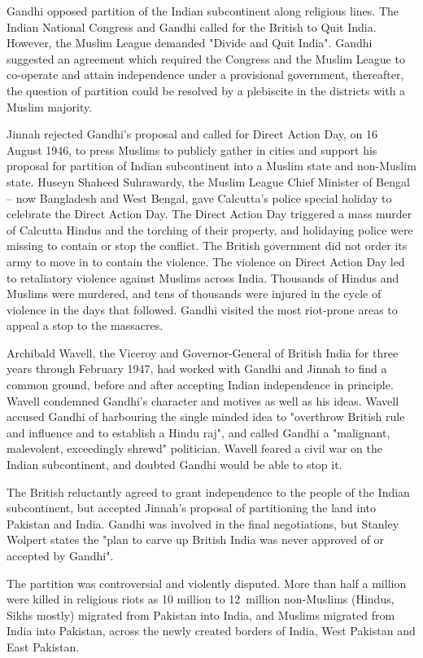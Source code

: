 Gandhi opposed partition of the Indian subcontinent along religious
lines. The Indian National Congress and Gandhi called for the British to
Quit India. However, the Muslim League demanded "Divide and Quit India".
Gandhi suggested an agreement which required the Congress and the Muslim
League to co-operate and attain independence under a provisional
government, thereafter, the question of partition could be resolved by a
plebiscite in the districts with a Muslim majority.

Jinnah rejected Gandhi's proposal and called for Direct Action Day, on
16 August 1946, to press Muslims to publicly gather in cities and
support his proposal for partition of Indian subcontinent into a Muslim
state and non-Muslim state. Huseyn Shaheed Suhrawardy, the Muslim League
Chief Minister of Bengal -- now Bangladesh and West Bengal, gave
Calcutta's police special holiday to celebrate the Direct Action Day.
The Direct Action Day triggered a mass murder of Calcutta Hindus and the
torching of their property, and holidaying police were missing to
contain or stop the conflict. The British government did not order its
army to move in to contain the violence. The violence on Direct Action
Day led to retaliatory violence against Muslims across India. Thousands
of Hindus and Muslims were murdered, and tens of thousands were injured
in the cycle of violence in the days that followed. Gandhi visited the
most riot-prone areas to appeal a stop to the massacres.

Archibald Wavell, the Viceroy and Governor-General of British India for
three years through February 1947, had worked with Gandhi and Jinnah to
find a common ground, before and after accepting Indian independence in
principle. Wavell condemned Gandhi's character and motives as well as
his ideas. Wavell accused Gandhi of harbouring the single minded idea to
"overthrow British rule and influence and to establish a Hindu raj", and
called Gandhi a "malignant, malevolent, exceedingly shrewd" politician.
Wavell feared a civil war on the Indian subcontinent, and doubted Gandhi
would be able to stop it.

The British reluctantly agreed to grant independence to the people of
the Indian subcontinent, but accepted Jinnah's proposal of partitioning
the land into Pakistan and India. Gandhi was involved in the final
negotiations, but Stanley Wolpert states the "plan to carve up British
India was never approved of or accepted by Gandhi".

The partition was controversial and violently disputed. More than half a
million were killed in religious riots as 10 million to 12~million
non-Muslims (Hindus, Sikhs mostly) migrated from Pakistan into India,
and Muslims migrated from India into Pakistan, across the newly created
borders of India, West Pakistan and East Pakistan.

